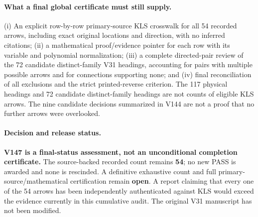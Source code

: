 \documentclass[11pt]{article}
\begin{document}
\paragraph{What a final global certificate must still supply.} (i) An explicit row-by-row primary-source KLS crosswalk for all 54 recorded arrows, including exact original locations and direction, with no inferred citations; (ii) a mathematical proof/evidence pointer for each row with its variable and polynomial normalization; (iii) a complete directed-pair review of the 72 candidate distinct-family V31 headings, accounting for pairs with multiple possible arrows and for connections supporting none; and (iv) final reconciliation of all exclusions and the strict printed-reverse criterion. The 117 physical headings and 72 candidate distinct-family headings are not counts of eligible KLS arrows. The nine candidate decisions summarized in V144 are not a proof that no further arrows were overlooked.

\paragraph{Decision and release status.} \textbf{V147 is a final-status assessment, not an unconditional completion certificate.} The source-backed recorded count remains \textbf{54}; no new PASS is awarded and none is rescinded. A definitive exhaustive count and full primary-source/mathematical certification remain \textbf{open}. A report claiming that every one of the 54 arrows has been independently authenticated against KLS would exceed the evidence currently in this cumulative audit. The original V31 manuscript has not been modified.
\end{document}
